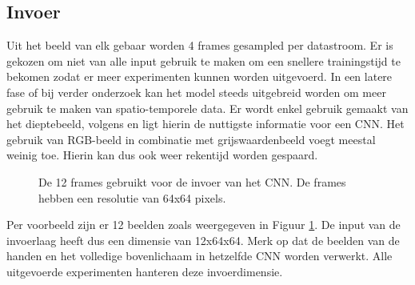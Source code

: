 \subsection{Invoer}
Uit het beeld van elk gebaar worden 4 frames gesampled per datastroom. Er is gekozen om niet van alle input gebruik te maken om een snellere trainingstijd te bekomen zodat er meer experimenten kunnen worden uitgevoerd. In een latere fase of bij verder onderzoek kan het model steeds uitgebreid worden om meer gebruik te maken van spatio-temporele data.
\npar Er wordt enkel gebruik gemaakt van het dieptebeeld, volgens \cite{lionel} en \cite{wu_deep_2014} ligt hierin de nuttigste informatie voor een CNN. Het gebruik van RGB-beeld in combinatie met grijswaardenbeeld voegt meestal weinig toe. Hierin kan dus ook weer rekentijd worden gespaard.
\begin{figure}
	\centering
	\def\svgwidth{0.5\columnwidth}
	
	\caption{De 12 frames gebruikt voor de invoer van het CNN. De frames hebben een resolutie van 64x64 pixels.}
	\label{fig:dataset-input}
\end{figure}
\npar Per voorbeeld zijn er 12 beelden zoals weergegeven in Figuur \ref{fig:dataset-input}. De input van de invoerlaag heeft dus een dimensie van 12x64x64. Merk op dat de beelden van de handen en het volledige bovenlichaam in hetzelfde CNN worden verwerkt. Alle uitgevoerde experimenten hanteren deze invoerdimensie.

